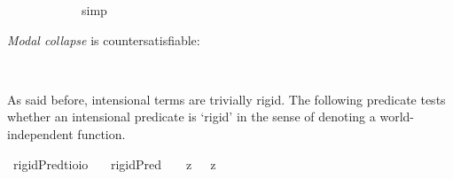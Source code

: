 \begin{isabellebody}
\ \isamarkupfalse%
\ {\isachardoublequoteopen}{\isasymlfloor}{\isacharparenleft}{\isacharparenleft}{\isasymlambda}{\isasymalpha}{\isachardot}\ {\isasymphi}\ {\isasymalpha}{\isacharparenright}\ {\isasymdownharpoonleft}{\isacharparenleft}{\isasymtau}{\isacharcolon}{\isacharcolon}{\isasymup}{\isasymzero}{\isacharparenright}{\isacharparenright}\ \isactrlbold {\isasymleftrightarrow}\ {\isacharparenleft}{\isasymphi}\ {\isasymdownharpoonleft}{\isasymtau}{\isacharparenright}{\isasymrfloor}{\isachardoublequoteclose}%
\ %
%
\isamarkupfalse%
\ simp%
%
%
\isanewline
\ \isamarkupfalse%
\ {\isachardoublequoteopen}{\isasymlfloor}{\isacharparenleft}{\isacharparenleft}{\isasymlambda}{\isasymalpha}{\isachardot}\ \isactrlbold {\isasymbox}{\isasymphi}\ {\isasymalpha}{\isacharparenright}\ {\isasymdownharpoonleft}{\isacharparenleft}{\isasymtau}{\isacharcolon}{\isacharcolon}{\isasymup}{\isasymzero}{\isacharparenright}{\isacharparenright}\ \isactrlbold {\isasymleftrightarrow}\ {\isacharparenleft}\isactrlbold {\isasymbox}{\isasymphi}\ {\isasymdownharpoonleft}{\isasymtau}{\isacharparenright}{\isasymrfloor}{\isachardoublequoteclose}\ \isamarkupfalse%
%
\ %
%
\isamarkupfalse%
\ %
%
%
%
%
\begin{isamarkuptext}%
\emph{Modal collapse} is countersatisfiable:%
\end{isamarkuptext}\isamarkuptrue%
\isamarkupfalse%
\ {\isachardoublequoteopen}{\isasymlfloor}{\isasymphi}\ \isactrlbold {\isasymrightarrow}\ \isactrlbold {\isasymbox}{\isasymphi}{\isasymrfloor}{\isachardoublequoteclose}\ \isamarkupfalse%
%
\ %
%
\isamarkupfalse%
\ \ \ %
%
%
%
%
\isamarkuptrue%
%
\begin{isamarkuptext}%
As said before, intensional terms are trivially rigid. The following predicate tests whether an intensional
predicate is `rigid' in the sense of denoting a world-independent function.%
\end{isamarkuptext}\isamarkuptrue%
\isamarkupfalse%
\ rigidPred{\isacharcolon}{\isacharcolon}{\isachardoublequoteopen}{\isacharparenleft}{\isacharprime}t{\isasymRightarrow}io{\isacharparenright}{\isasymRightarrow}io{\isachardoublequoteclose}\ \isanewline
\ \ {\isachardoublequoteopen}rigidPred\ {\isasymtau}\ {\isasymequiv}\ {\isacharparenleft}{\isasymlambda}{\isasymbeta}{\isachardot}\ \isactrlbold {\isasymbox}{\isacharparenleft}{\isacharparenleft}{\isasymlambda}z{\isachardot}\ {\isasymbeta}\ \isactrlbold {\isasymapprox}\ z{\isacharparenright}\ \isactrlbold {\isasymdown}{\isasymtau}{\isacharparenright}{\isacharparenright}\ \isactrlbold {\isasymdown}{\isasymtau}{\isachardoublequoteclose}%

\end{isabellebody}
